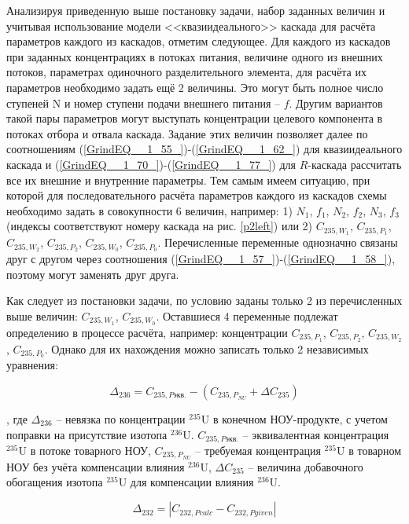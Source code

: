 Анализируя приведенную выше постановку задачи, набор заданных величин и учитывая использование модели <<квазиидеального>> каскада для расчёта параметров каждого из каскадов, отметим следующее. Для каждого из каскадов при заданных концентрациях в потоках питания, величине одного из внешних потоков, параметрах одиночного разделительного элемента, для расчёта их параметров необходимо задать ещё 2 величины. Это могут быть полное число ступеней N и номер ступени подачи внешнего питания -- $f$. Другим вариантов такой пары параметров могут выступать концентрации целевого компонента в потоках отбора и отвала каскада. Задание этих величин позволяет далее по соотношениям (\ref{GrindEQ__1_55_})-(\ref{GrindEQ__1_62_}) для квазиидеального каскада и (\ref{GrindEQ__1_70_})-(\ref{GrindEQ__1_77_}) для $R$-каскада рассчитать все их внешние и внутренние параметры. Тем самым имеем ситуацию, при которой для последовательного расчёта параметров каждого из каскадов схемы необходимо задать в совокупности 6 величин, например: 1) $N_1$, $f_1$, $N_2$, $f_2$, $N_3$, $f_3$ (индексы соответствуют номеру каскада на рис. \ref{p2left}) или 2) $C_{235,{W_1}}$, $C_{235,{P_1}}$, $C_{235,{W_2}}$, $C_{235,{P_2}}$, $C_{235,{W_0}}$, $C_{235,{P_0}}$. Перечисленные переменные однозначно связаны друг с другом через соотношения (\ref{GrindEQ__1_57_})-(\ref{GrindEQ__1_58_}), поэтому могут заменять друг друга. 

Как следует из постановки задачи, по условию заданы только 2 из перечисленных выше величин: $C_{235,{W_1}}$, $C_{235,{W_0}}$. Оставшиеся 4 переменные подлежат определению в процессе расчёта, например: концентрации $C_{235,{P_1}}$, $C_{235,{P_2}}$, $C_{235,{W_2}}$, $C_{235,{P_0}}$. Однако для их нахождения можно записать только 2 независимых уравнения:  

\begin{equation}
    \label{dis_235_6}
    \Delta_{236}=C_{235,P\textit{экв.}}-(C_{235,{P_{NU}}}+\Delta C_{235})
\end{equation}

, где $\Delta_{236}$ -- невязка по концентрации $^{235}$U в конечном НОУ-продукте, с учетом поправки на присутствие изотопа $^{236}$U. $C_{235,P\textit{экв.}}$ -- эквивалентная концентрация $^{235}$U в потоке товарного НОУ, $C_{235,{P_{NU}}}$ -- требуемая концентрация $^{235}$U в товарном НОУ без учёта компенсации влияния $^{236}$U, $\Delta C_{235}$ -- величина добавочного обогащения изотопа $^{235}$U для компенсации влияния $^{236}$U. 

\begin{equation}
\label{dis_232}
\Delta_{232}=\left|C_{232,P\textit{calc}}-C_{232,P\textit{given}}\right|
\end{equation}

